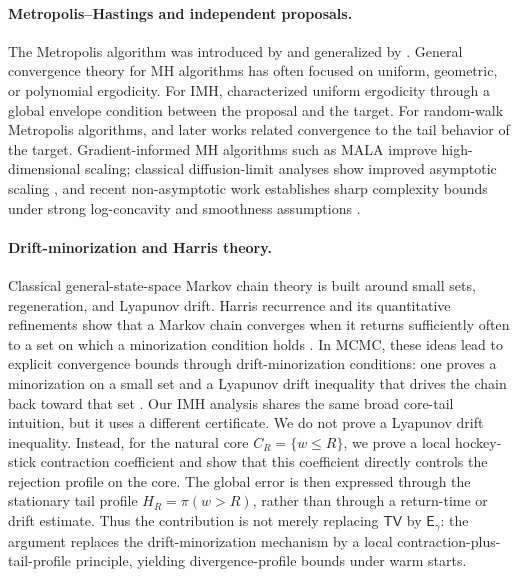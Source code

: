 \documentclass[10pt, journal]{IEEEtran}
\newcommand{\TV}{\mathsf{TV}}
\begin{document}
\paragraph{Metropolis--Hastings and independent proposals.}
The Metropolis algorithm was introduced by \cite{metropolis1953equation} and generalized by \cite{Hastings1970monte}. General convergence theory for MH algorithms has often focused on uniform, geometric, or polynomial ergodicity. For IMH, \cite{MengersonTweedie} characterized uniform ergodicity through a global envelope condition between the proposal and the target. For random-walk Metropolis algorithms, \cite{roberts1996geometric} and later works related convergence to the tail behavior of the target. Gradient-informed MH algorithms such as MALA improve high-dimensional scaling; classical diffusion-limit analyses show improved asymptotic scaling \cite{roberts1998optimal}, and recent non-asymptotic work establishes sharp complexity bounds under strong log-concavity and smoothness assumptions \cite{chewi2021optimal}.

\paragraph{Drift-minorization and Harris theory.}
Classical general-state-space Markov chain theory is built around small sets, regeneration, and Lyapunov drift. Harris recurrence and its quantitative refinements show that a Markov chain converges when it returns sufficiently often to a set on which a minorization condition holds \cite{harris1956existence,nummelin1984general,meyn2009markov}. In MCMC, these ideas lead to explicit convergence bounds through drift-minorization conditions: one proves a minorization on a small set and a Lyapunov drift inequality that drives the chain back toward that set \cite{rosenthal1995minorization,baxendale2005renewal,jones2001honest,hairer2011yet}. Our IMH analysis shares the same broad core-tail intuition, but it uses a different certificate. We do not prove a Lyapunov drift inequality. Instead, for the natural core $C_R=\{w\le R\}$, we prove a local hockey-stick contraction coefficient and show that this coefficient directly controls the rejection profile on the core. The global error is then expressed through the stationary tail profile $H_R=\pi(w>R)$, rather than through a return-time or drift estimate. Thus the contribution is not merely replacing $\TV$ by $\mathsf E_\gamma$: the argument replaces the drift-minorization mechanism by a local contraction-plus-tail-profile principle, yielding divergence-profile bounds under warm starts.
\end{document}
